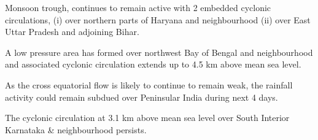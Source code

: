 \item  Monsoon trough, continues to remain active with 2 embedded cyclonic circulations, (i) over northern parts of Haryana and neighbourhood (ii) over East Uttar Pradesh and adjoining Bihar.
\item A low pressure area has formed over northwest Bay of Bengal and neighbourhood and associated cyclonic circulation extends up to 4.5 km above mean sea level.
\item As the cross equatorial flow is likely to continue to remain weak, the rainfall activity could remain subdued over Peninsular India during next 4 days.
\item The cyclonic circulation at 3.1 km above mean sea level over South Interior Karnataka \& neighbourhood persists.